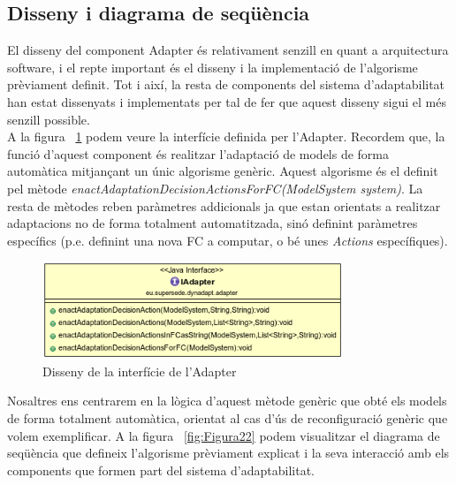 \subsection{Disseny i diagrama de seqüència}

El disseny del component Adapter és relativament senzill en quant a arquitectura software, i el repte important és el disseny i la implementació de l'algorisme prèviament definit. Tot i així, la resta de components del sistema d'adaptabilitat han estat dissenyats i implementats per tal de fer que aquest disseny sigui el més senzill possible.\\

A la figura ~\ref{fig:Figura26} podem veure la interfície definida per l'Adapter. Recordem que, la funció d'aquest component és realitzar l'adaptació de models de forma automàtica mitjançant un únic algorisme genèric. Aquest algorisme és el definit pel mètode \textit{enactAdaptationDecisionActionsForFC(ModelSystem system)}. La resta de mètodes reben paràmetres addicionals ja que estan orientats a realitzar adaptacions no de forma totalment automatitzada, sinó definint paràmetres específics (p.e. definint una nova FC a computar, o bé unes \textit{Actions} específiques).\\

\begin{figure}
\centering
\includegraphics[width=9cm]{Figures/Figure26}
\decoRule
\caption{Disseny de la interfície de l'Adapter}
\label{fig:Figura26}
\end{figure}

Nosaltres ens centrarem en la lògica d'aquest mètode genèric que obté els models de forma totalment automàtica, orientat al cas d'ús de reconfiguració genèric que volem exemplificar. A la figura ~\ref{fig:Figura22} podem visualitzar el diagrama de seqüència que defineix l'algorisme prèviament explicat i la seva interacció amb els components que formen part del sistema d'adaptabilitat. 

